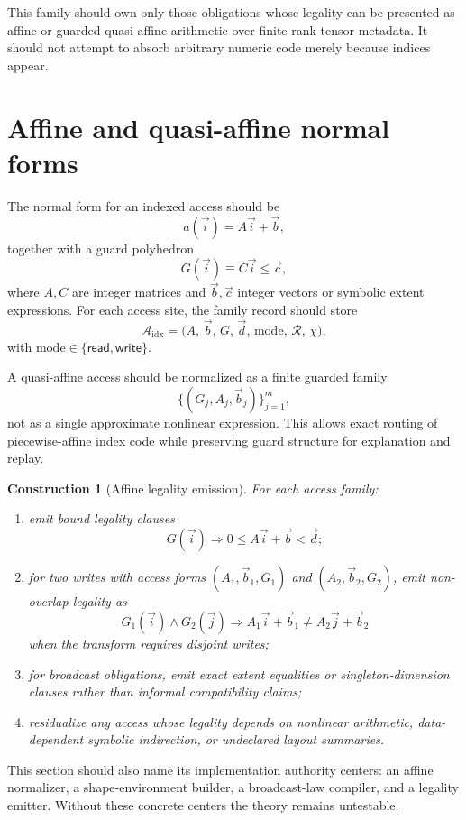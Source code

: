 \documentclass[11pt]{report}
\newtheorem{construction}[definition]{Construction}
\begin{document}
This family should own only those obligations whose legality can be presented as affine or guarded quasi-affine arithmetic over finite-rank tensor metadata. It should not attempt to absorb arbitrary numeric code merely because indices appear.
\section{Affine and quasi-affine normal forms}
The normal form for an indexed access should be
\[
a(\vec{i}) = A\vec{i} + \vec{b},
\]
together with a guard polyhedron
\[
G(\vec{i}) \equiv C\vec{i} \le \vec{c},
\]
where $A,C$ are integer matrices and $\vec{b},\vec{c}$ integer vectors or symbolic extent expressions. For each access site, the family record should store
\[
\mathcal{A}_{\mathrm{idx}}
=
\bigl(
A,\,
\vec{b},\,
G,\,
\vec{d},\,
\mathrm{mode},\,
\mathcal{R},\,
\chi
\bigr),
\]
with $\mathrm{mode} \in \{\mathsf{read},\mathsf{write}\}$.

A quasi-affine access should be normalized as a finite guarded family
\[
\{(G_j, A_j, \vec{b}_j)\}_{j=1}^m,
\]
not as a single approximate nonlinear expression. This allows exact routing of piecewise-affine index code while preserving guard structure for explanation and replay.

\begin{construction}[Affine legality emission]
For each access family:
\begin{enumerate}
\item emit bound legality clauses
\[
G(\vec{i}) \Rightarrow 0 \le A\vec{i} + \vec{b} < \vec{d};
\]
\item for two writes with access forms $(A_1,\vec{b}_1,G_1)$ and $(A_2,\vec{b}_2,G_2)$, emit non-overlap legality as
\[
G_1(\vec{i}) \wedge G_2(\vec{j}) \Rightarrow A_1\vec{i}+\vec{b}_1 \neq A_2\vec{j}+\vec{b}_2
\]
when the transform requires disjoint writes;
\item for broadcast obligations, emit exact extent equalities or singleton-dimension clauses rather than informal compatibility claims;
\item residualize any access whose legality depends on nonlinear arithmetic, data-dependent symbolic indirection, or undeclared layout summaries.
\end{enumerate}
\end{construction}

This section should also name its implementation authority centers: an affine normalizer, a shape-environment builder, a broadcast-law compiler, and a legality emitter. Without these concrete centers the theory remains untestable.
\end{document}
